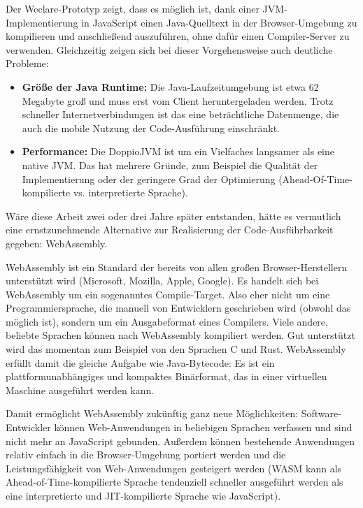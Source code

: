 Der Weclare-Prototyp zeigt, dass es möglich ist, dank einer JVM-Implementierung in JavaScript einen Java-Quelltext in der Browser-Umgebung zu kompilieren und anschließend auszuführen, ohne dafür einen Compiler-Server zu verwenden. Gleichzeitig zeigen sich bei dieser Vorgehensweise auch deutliche Probleme:

\begin{itemize}
    \item \textbf{Größe der Java Runtime:} Die Java-Laufzeitumgebung ist etwa 62 Megabyte groß und muss erst vom Client heruntergeladen werden. Trotz schneller Internetverbindungen ist das eine beträchtliche Datenmenge, die auch die mobile Nutzung der Code-Ausführung einschränkt.
    \item \textbf{Performance:} Die DoppioJVM ist um ein Vielfaches langsamer als eine native JVM. Das hat mehrere Gründe, zum Beispiel die Qualität der Implementierung oder der geringere Grad der Optimierung (Ahead-Of-Time-kompilierte vs. interpretierte Sprache).
\end{itemize}

Wäre diese Arbeit zwei oder drei Jahre später entstanden, hätte es vermutlich eine ernstzunehmende Alternative zur Realisierung der Code-Ausführbarkeit gegeben: WebAssembly.

WebAssembly ist ein Standard der bereits von allen großen Browser-Herstellern unterstützt wird (Microsoft, Mozilla, Apple, Google). Es handelt sich bei WebAssembly um ein sogenanntes Compile-Target. Also eher nicht um eine Programmiersprache, die manuell von Entwicklern geschrieben wird (obwohl das möglich ist), sondern um ein Ausgabeformat eines Compilers. Viele andere, beliebte Sprachen können nach WebAssembly kompiliert werden. Gut unterstützt wird das momentan zum Beispiel von den Sprachen C und Rust. WebAssembly erfüllt damit die gleiche Aufgabe wie Java-Bytecode: Es ist ein plattformunabhängiges und kompaktes Binärformat, das in einer virtuellen Maschine ausgeführt werden kann.

Damit ermöglicht WebAssembly zukünftig ganz neue Möglichkeiten: Software-Entwickler können Web-Anwendungen in beliebigen Sprachen verfassen und sind nicht mehr an JavaScript gebunden. Außerdem können bestehende Anwendungen relativ einfach in die Browser-Umgebung portiert werden und die Leistungsfähigkeit von Web-Anwendungen gesteigert werden (WASM kann als Ahead-of-Time-kompilierte Sprache tendenziell schneller ausgeführt werden als eine interpretierte und JIT-kompilierte Sprache wie JavaScript).

